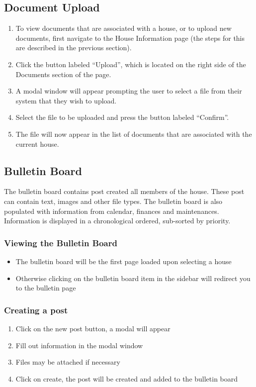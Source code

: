 \documentclass[12pt]{article}
\begin{document}
    \subsection{Document Upload} %
    \begin{enumerate}
        \item To view documents that are associated with a house, or to upload new documents, first navigate to the House Information page (the steps for this are described in the previous section).
        \item Click the button labeled ``Upload'', which is located on the right side of the Documents section of the page.
        \item A modal window will appear prompting the user to select a file from their system that they wish to upload.
        \item Select the file to be uploaded and press the button labeled ``Confirm''.
        \item The file will now appear in the list of documents that are associated with the current house.
    \end{enumerate}
    
    \subsection{Bulletin Board}
    The bulletin board contains post created all members of the house. These post can contain text, images and other file types.
    The bulletin board is also populated with information from calendar, finances and maintenances.
    Information is displayed in a chronological ordered, sub-sorted by priority.
    
    \subsubsection{Viewing the Bulletin Board}
    \begin{itemize}
        \item The bulletin board will be the first page loaded upon selecting a house
        \item Otherwise clicking on the bulletin board item in the sidebar will redirect you to the bulletin page
    \end{itemize}
    
    \subsubsection{Creating a post}
    \begin{enumerate}
        \item Click on the new post button, a modal will appear
        \item Fill out information in the modal window
        \item Files may be attached if necessary
        \item Click on create, the post will be created and added to the bulletin board
    \end{enumerate}
    
\end{document}
